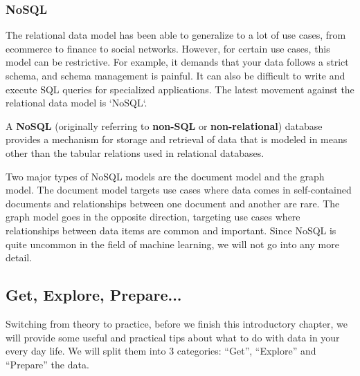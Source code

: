 \subsubsection{NoSQL}

The relational data model has been able to generalize to a lot of use cases, from ecommerce to finance to social
networks. However, for certain use cases, this model can be restrictive. For example, it demands that your data
follows a strict schema, and schema management is painful. It can also be difficult to write and execute SQL queries
for specialized applications. The latest movement against the relational data model is `NoSQL`.

\bd[NoSQL]
A \textbf{NoSQL} (originally referring to \textbf{non-SQL} or \textbf{non-relational}) database provides a mechanism for
storage and retrieval of data that is modeled in means other than the tabular relations used in relational databases.
\ed

Two major types of NoSQL models are the document model and the graph model. The document model targets use
cases where data comes in self-contained documents and relationships between one document and another are rare. The
graph model goes in the opposite direction, targeting use cases where relationships between data items are common and
important. Since NoSQL is quite uncommon in the field of machine learning, we will not go into any more detail.

\subsection{Get, Explore, Prepare...}

Switching from theory to practice, before we finish this introductory chapter, we will provide some useful and practical
tips about what to do with data in your every day life. We will split them into 3 categories: ``Get'', ``Explore'' and
``Prepare'' the data.

